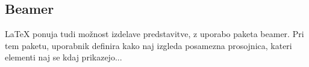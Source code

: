 \documentclass[10p, a4paper, twopage]{book}
\begin{document}
\subsection{Beamer}
\LaTeX{} ponuja tudi možnost izdelave predstavitve, z uporabo paketa beamer. Pri tem paketu, uporabnik definira kako naj izgleda posamezna prosojnica, kateri elementi naj se kdaj prikazejo...




\end{document}
